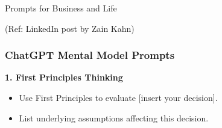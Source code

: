 
			



\begin{frame}[fragile]\frametitle{}
\begin{center}
{\Large Prompts for Business and Life}
\end{center}

{\tiny (Ref: LinkedIn post by Zain Kahn)}
\end{frame}

\begin{frame}[fragile]\frametitle{ChatGPT Mental Model Prompts}
\textbf{1. First Principles Thinking}
\begin{itemize}
    \item Use First Principles to evaluate [insert your decision].
    \item List underlying assumptions affecting this decision.
\end{itemize}
\end{frame}


